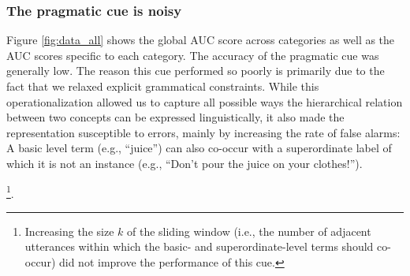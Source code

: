\documentclass[10pt, letterpaper]{article}
\begin{document}
\hypertarget{the-pragmatic-cue-is-noisy}{%
\subsubsection{The pragmatic cue is
noisy}\label{the-pragmatic-cue-is-noisy}}

Figure \ref{fig:data_all} shows the global AUC score across categories
as well as the AUC scores specific to each category. The accuracy of the
pragmatic cue was generally low. The reason this cue performed so poorly
is primarily due to the fact that we relaxed explicit grammatical
constraints. While this operationalization allowed us to capture all
possible ways the hierarchical relation between two concepts can be
expressed linguistically, it also made the representation susceptible to
errors, mainly by increasing the rate of false alarms: A basic level
term (e.g., ``juice'') can also co-occur with a superordinate label of
which it is not an instance (e.g., ``Don't pour the juice on your
clothes!'').

\footnote{Increasing the size $k$ of the sliding window (i.e., the number
of adjacent utterances within which the basic- and superordinate-level
terms should co-occur) did not improve the performance of this cue.}.
\end{document}
